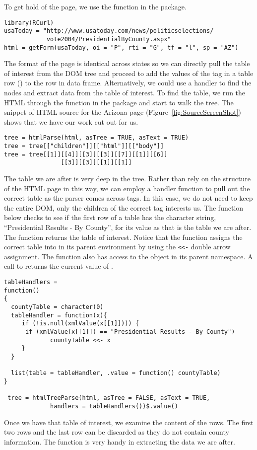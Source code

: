 To get hold of the page, we use the  function 
in the  package.
\begin{verbatim}
library(RCurl)
usaToday = "http://www.usatoday.com/news/politicselections/
            vote2004/PresidentialByCounty.aspx"
html = getForm(usaToday, oi = "P", rti = "G", tf = "l", sp = "AZ")
\end{verbatim}
The format of the page is identical across states so we can
directly pull the table of interest from the DOM tree and proceed to add
the values of the  tag in a table row () 
to the row in data frame. 
Alternatively, we could use a handler to find the 
nodes and extract data from the table of interest.
To find the table, we run the HTML through the 
function in the  package and start to walk the tree.
The snippet of HTML source for the Arizona page 
(Figure~\ref{fig:SourceScreenShot})
shows that we have our work cut out for us.
\begin{verbatim}
tree = htmlParse(html, asTree = TRUE, asText = TRUE)
tree = tree[["children"]][["html"]][["body"]]
tree = tree[[1]][[4]][[3]][[3]][[7]][[1]][[6]]
                [[3]][[3]][[1]][[1]]
\end{verbatim}
The table we are after is very deep in the tree.
Rather than rely on the structure of the HTML page in this way,
we can employ a handler function to pull out the correct table
as the parser comes across  tags.
In this case, we do not need to keep the entire
DOM, only the children of the correct  tag interests us.
The  function below checks to see if
the first row of a table has the character string,
``Presidential Results - By County'', for its value
as that is the table we are after.
The  function returns the table of interest.
Notice that the  function assigns
the correct table into  in its parent environment 
by using the \verb+<<-+ double arrow assignment.
The  function also has access to the
 object in its parent namespace.
A call to  returns the current value of
.
\small{
\begin{verbatim}
tableHandlers =
function()
{
  countyTable = character(0)
  tableHandler = function(x){
     if (!is.null(xmlValue(x[[1]]))) {
      if (xmlValue(x[[1]]) == "Presidential Results - By County")
             countyTable <<- x
     }
  }

  list(table = tableHandler, .value = function() countyTable)
}

 tree = htmlTreeParse(html, asTree = FALSE, asText = TRUE,
             handlers = tableHandlers())$.value()
\end{verbatim}
}
Once we have that table of interest, we examine the content of the rows.
The first two rows and the last row can be discarded as they
do not contain county information.
The  function is very handy in extracting the
data we are after.

